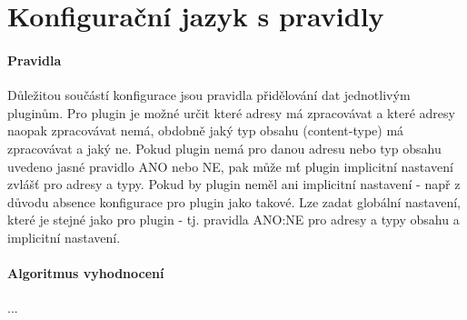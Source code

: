 \documentclass[10pt]{article}
\begin{document}
\section{Konfigura\v{c}n\'i jazyk s pravidly}
\paragraph{Pravidla}D\r{u}le\v{z}itou sou\v{c}\'ast\'i konfigurace jsou pravidla p\v{r}id\v{e}lov\'an\'i dat jednotliv\'ym plugin\r{u}m. Pro plugin je mo\v{z}n\'e ur\v{c}it kter\'e adresy m\'a zpracov\'avat a kter\'e adresy naopak zpracov\'avat nem\'a, obdobn\v{e} jak\'y typ obsahu (content-type) m\'a zpracov\'avat a jak\'y ne. Pokud plugin nem\'a pro danou adresu nebo typ obsahu uvedeno jasn\'e pravidlo ANO nebo NE, pak m\r{u}\v{z}e m\'t plugin implicitn\'i nastaven\'i zvl\'a\v{s}\v{t} pro adresy a typy. Pokud by plugin nem\v{e}l ani implicitn\'i nastaven\'i - nap\v{r} z d\r{u}vodu absence konfigurace pro plugin jako takov\'e. Lze zadat glob\'aln\'i nastaven\'i, kter\'e je stejn\'e jako pro plugin - tj. pravidla ANO:NE pro adresy a typy obsahu a implicitn\'i nastaven\'i.
\paragraph{Algoritmus vyhodnocen\'i}...
\end{document}
